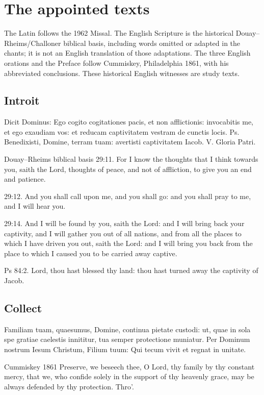 \section{The appointed texts}
The Latin follows the 1962 Missal. The English Scripture is the historical Douay--Rheims/Challoner biblical basis, including words omitted or adapted in the chants; it is not an English translation of those adaptations. The three English orations and the Preface follow Cummiskey, Philadelphia 1861, with his abbreviated conclusions. These historical English witnesses are study texts.

\subsection{Introit}
\label{proper-introit}
\begin{latinproper}
Dicit Dominus: Ego cogito cogitationes pacis, et non afflictionis: invocabitis me, et ego exaudiam vos: et reducam captivitatem vestram de cunctis locis. Ps. Benedixisti, Domine, terram tuam: avertisti captivitatem Iacob. V. Gloria Patri.
\end{latinproper}
\begin{englishwitness}{Douay--Rheims biblical basis}
29:11. For I know the thoughts that I think towards you, saith the
Lord, thoughts of peace, and not of affliction, to give you an end and
patience.

29:12. And you shall call upon me, and you shall go: and you shall pray
to me, and I will hear you.

29:14. And I will be found by you, saith the Lord: and I will bring
back your captivity, and I will gather you out of all nations, and from
all the places to which I have driven you out, saith the Lord: and I
will bring you back from the place to which I caused you to be carried
away captive.

Ps 84:2. Lord, thou hast blessed thy land: thou hast turned away the
captivity of Jacob.
\end{englishwitness}

\subsection{Collect}
\label{proper-collect}
\begin{latinproper}
Familiam tuam, quaesumus, Domine, continua pietate custodi: ut, quae in sola spe gratiae caelestis innititur, tua semper protectione muniatur. Per Dominum nostrum Iesum Christum, Filium tuum: Qui tecum vivit et regnat in unitate.
\end{latinproper}
\begin{englishwitness}{Cummiskey 1861}
Preserve, we beseech thee, O Lord, thy family by thy constant mercy, that we, who confide solely in the support of thy heavenly grace, may be always defended by thy protection. Thro'.
\end{englishwitness}

